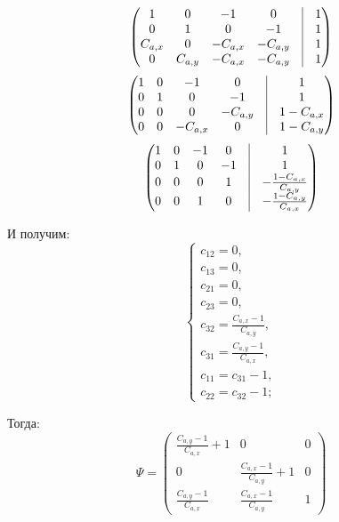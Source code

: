 $$
\begin{pmatrix}
	1       & 0       & -1       &  0       & \vrule & 1\\
	0       & 1       &  0       & -1       & \vrule & 1\\
	C_{a,x} & 0       & -C_{a,x} & -C_{a,y} & \vrule & 1\\
	0       & C_{a,y} & -C_{a,x} & -C_{a,y} & \vrule & 1\\
\end{pmatrix}
$$
$$
\begin{pmatrix}
	1 & 0 & -1       &  0       & \vrule & 1\\
	0 & 1 &  0       & -1       & \vrule & 1\\
	0 & 0 &  0       & -C_{a,y} & \vrule & 1 - C_{a,x}\\
	0 & 0 & -C_{a,x} & 0        & \vrule & 1 - C_{a,y}\\
\end{pmatrix}
$$
$$
\begin{pmatrix}
	1 & 0 & -1 &  0 & \vrule & 1\\
	0 & 1 &  0 & -1 & \vrule & 1\\
	0 & 0 &  0 &  1 & \vrule & -\frac{1 - C_{a,x}}{C_{a,y}}\\
	0 & 0 &  1 &  0 & \vrule & -\frac{1 - C_{a,y}}{C_{a,x}}\\
\end{pmatrix}
$$

И получим:
$$
\begin{cases}
	c_{12} = 0,\\
	c_{13} = 0,\\
	c_{21} = 0,\\
	c_{23} = 0,\\
	c_{32} = \frac{C_{a,x} - 1}{C_{a,y}},\\
	c_{31} = \frac{C_{a,y} - 1}{C_{a,x}},\\
	c_{11} = c_{31} - 1,\\
	c_{22} = c_{32} - 1;
\end{cases}
$$

Тогда:
$$
\Psi = 
\begin{pmatrix}
	\frac{C_{a,y}-1}{C_{a,x}} + 1 & 0 & 0 \\
	0 & \frac{C_{a,x}-1}{C_{a,y}}+1 & 0 \\
	\frac{C_{a,y}-1}{C_{a,x}} & \frac{C_{a,x}-1}{C_{a,y}} & 1
\end{pmatrix}
$$